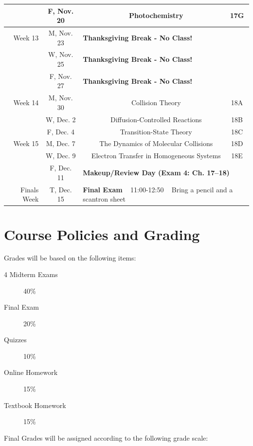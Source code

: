 \documentclass[12pt, letterpaper]{article}
\begin{document}
\begin{tabular}{rcccc}
	            & F, Nov. 20 &                                                                                             & Photochemistry                               & 17G     \\
	\midrule
	Week 13     & M, Nov. 23 & \multicolumn{3}{l}{\textbf{Thanksgiving Break - No Class!}}                                                                                          \\
	            & W, Nov. 25 & \multicolumn{3}{l}{\textbf{Thanksgiving Break - No Class!}}                                                                                          \\
	            & F, Nov. 27 & \multicolumn{3}{l}{\textbf{Thanksgiving Break - No Class!}}                                                                                          \\
	\midrule
	Week 14     & M, Nov. 30 &                                                                                             & Collision Theory                             & 18A     \\
	            & W, Dec. 2  &                                                                                             & Diffusion-Controlled Reactions               & 18B     \\
	            & F, Dec. 4  &                                                                                             & Transition-State Theory                      & 18C     \\
	\midrule
	Week 15     & M, Dec. 7  &                                                                                             & The Dynamics of Molecular Collisions         & 18D     \\
	            & W, Dec. 9  &                                                                                             & Electron Transfer in Homogeneous Systems     & 18E     \\
	            & F, Dec. 11 & \multicolumn{3}{l}{\textbf{Makeup/Review Day (Exam 4: Ch. 17--18)}}                                                                                  \\
	\midrule
	\midrule
	Finals Week & T, Dec. 15 & \multicolumn{3}{l}{\textbf{Final Exam} ~ 11:00-12:50 ~ Bring a pencil and a scantron sheet}                                                          \\
\end{tabular}


\section*{Course Policies and Grading}
Grades will be based on the following items:
\begin{description}
	\item[4 Midterm Exams] 40\%
	\item[Final Exam] 20\%
	\item[Quizzes] 10\%
	\item[Online Homework] 15\%
	\item[Textbook Homework] 15\%
\end{description}
Final Grades will be assigned according to the following grade scale:
\end{document}
